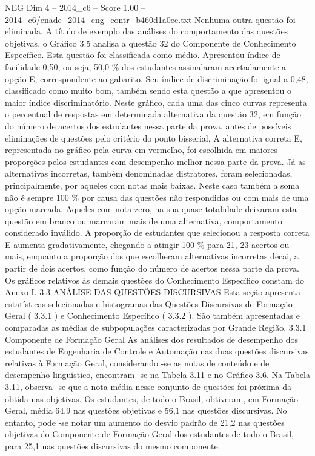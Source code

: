 \begin{textsample}{NEG Dim 4 – 2014\_c6 – Score 1.00 – 2014\_c6/enade\_2014\_eng\_contr\_b460d1a0ee.txt}
Nenhuma outra questão foi eliminada.
A título de exemplo das análises do comportamento das questões objetivas, o Gráfico 3.5 analisa a questão 32 do Componente de Conhecimento Específico.
Esta questão foi classificada como médio.
Apresentou índice de facilidade 0,50, ou seja, 50,0 \% dos estudantes assinalaram acertadamente a opção E, correspondente ao gabarito.
Seu índice de discriminação foi igual a 0,48, classificado como muito bom, também sendo esta questão a que apresentou o maior índice discriminatório.
Neste gráfico, cada uma das cinco curvas representa o percentual de respostas em determinada alternativa da questão 32, em função do número de acertos dos estudantes nessa parte da prova, antes de possíveis eliminações de questões pelo critério do ponto bisserial.
A alternativa correta E, representada no gráfico pela curva em vermelho, foi escolhida em maiores proporções pelos estudantes com desempenho melhor nessa parte da prova.
Já as alternativas incorretas, também denominadas distratores, foram selecionadas, principalmente, por aqueles com notas mais baixas.
Neste caso também a soma não é sempre 100 \% por causa das questões não respondidas ou com mais de uma opção marcada.
Aqueles com nota zero, na sua quase totalidade deixaram esta questão em branco ou marcaram mais de uma alternativa, comportamento considerado inválido.
A proporção de estudantes que selecionou a resposta correta E aumenta gradativamente, chegando a atingir 100 \% para 21, 23 acertos ou mais, enquanto a proporção dos que escolheram alternativas incorretas decai, a partir de dois acertos, como função do número de acertos nessa parte da prova.
Os gráficos relativos às demais questões do Conhecimento Específico constam do Anexo I. 3.3 ANÁLISE DAS QUESTÕES DISCURSIVAS Esta seção apresenta estatísticas selecionadas e histogramas das Questões Discursivas de Formação Geral ( 3.3.1 ) e Conhecimento Específico ( 3.3.2 ).
São também apresentadas e comparadas as médias de subpopulações caracterizadas por Grande Região. 3.3.1 Componente de Formação Geral As análises dos resultados de desempenho dos estudantes de Engenharia de Controle e Automação nas duas questões discursivas relativas à Formação Geral, considerando -se as notas de conteúdo e de desempenho linguístico, encontram -se na Tabela 3.11 e no Gráfico 3.6.
Na Tabela 3.11, observa -se que a nota média nesse conjunto de questões foi próxima da obtida nas objetivas.
Os estudantes, de todo o Brasil, obtiveram, em Formação Geral, média 64,9 nas questões objetivas e 56,1 nas questões discursivas.
No entanto, pode -se notar um aumento do desvio padrão de 21,2 nas questões objetivas do Componente de Formação Geral dos estudantes de todo o Brasil, para 25,1 nas questões discursivas do mesmo componente.

\end{textsample}

